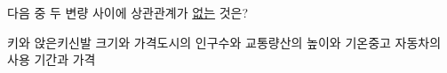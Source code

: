 다음 중 두 변량 사이에 상관관계가 \underline{없는} 것은?
\begin{choicesv}{키와 앉은키}{신발 크기와 가격}{도시의 인구수와 교통량}{산의 높이와 기온}{중고 자동차의 사용 기간과 가격}\end{choicesv}
